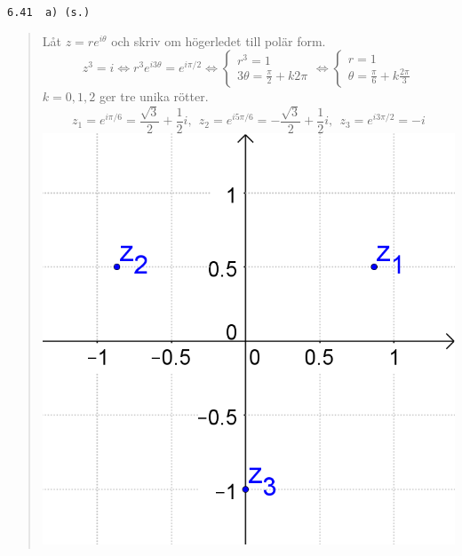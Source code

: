 \documentclass[a4paper]{article}
\newcommand{\tskcol}[1]{\textcolor{tskcol}{#1}}
\begin{document}
	\pagebreak
	\texttt{\tskcol{6.41~~a) (s.)}}
	\begin{quotation}
		\noindent
		Låt $z=re^{i\theta}$ och skriv om högerledet till polär form.
		\[z^3=i \Leftrightarrow
		r^3e^{i3\theta}=e^{i\pi/2} \Leftrightarrow
		\begin{cases}
		r^3 = 1 \\
		3\theta=\frac{\pi}{2}+k2\pi
		\end{cases} \Leftrightarrow
		\begin{cases}
		r=1 \\
		\theta=\frac{\pi}{6}+k\frac{2\pi}{3}
		\end{cases}\] 
		$k=0,1,2$ ger tre unika rötter.
		\[z_1=e^{i\pi/6}=\frac{\sqrt{3}}{2}+\frac{1}{2}i,~~
		z_2=e^{i5\pi/6}=-\frac{\sqrt{3}}{2}+\frac{1}{2}i,~~
		z_3=e^{i3\pi/2}=-i\]
		\includegraphics[scale=0.2]{images/641a.PNG}
	\end{quotation}
	
\end{document}
